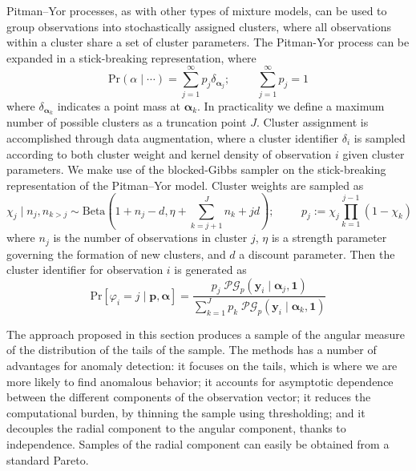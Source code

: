 Pitman--Yor processes, as with other types of mixture models, can be used to group 
    observations into stochastically assigned clusters, where all observations
    within a cluster share a set of cluster parameters.  The Pitman-Yor process
    can be expanded in a stick-breaking representation, where
    \[
        \text{Pr}(\alpha\mid\cdots) = \sum_{j = 1}^{\infty}p_j\delta_{\bm{\alpha}_j};
        \hspace{1cm}\sum_{j = 1}^{\infty}p_j = 1
    \]
    where $\delta_{\bm{\alpha}_k}$ indicates a point mass at $\bm{\alpha}_k$.
    In practicality we define a maximum number of possible clusters as a 
    truncation point $J$.  Cluster assignment is accomplished through data 
    augmentation, where a cluster identifier $\delta_i$ is sampled according to
    both cluster weight and kernel density of observation $i$ given cluster parameters.
    We make use of the blocked-Gibbs sampler on the stick-breaking representation of the
    Pitman--Yor model.  Cluster weights are sampled as
    \begin{equation}
        \label{eqn:clusterweight}
        \chi_{j} \mid n_j, n_{k>j} \sim \text{Beta}\left(1 + n_j - d, 
            \eta + \sum_{k = j + 1}^J n_k + jd\right);
        \hspace{1cm}p_j := \chi_j \prod_{k = 1}^{j-1}(1 - \chi_k)
    \end{equation}
    where $n_j$ is the number of observations in cluster $j$, $\eta$ is a strength 
    parameter governing the formation of new clusters, and $d$ a discount parameter.
    Then the cluster identifier for observation $i$ is generated as
    \begin{equation}
        \label{eqn:clusterid}
        \text{Pr}\left[\varphi_i = j\mid \bm{p},\bm{\alpha}\right] =
            \frac{p_j\;\mathcal{PG}_p\left(\bm{y}_i\mid\bm{\alpha}_j,\bm{1}\right)}{
                \sum_{k = 1}^J p_k\;
                \mathcal{PG}_p\left(\bm{y}_i\mid\bm{\alpha}_k,\bm{1}\right)}
    \end{equation}

The approach proposed in this section produces a sample of the angular measure 
    of the distribution of the tails of the sample. The methods has a number of 
    advantages for anomaly detection: it focuses on the tails, which is where we 
    are more likely to find anomalous behavior;  it accounts for asymptotic 
    dependence between the different components of the observation vector; it
    reduces the computational burden, by thinning the sample using thresholding; 
    and it decouples the radial component to the angular component, thanks to 
    independence. Samples of the radial component can easily be obtained from a 
    standard Pareto.

